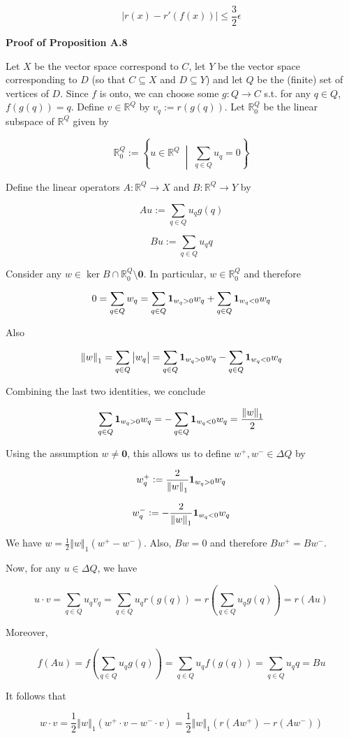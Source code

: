 \documentclass[a4paper]{article}
\newcommand{\Co}[1]{}
\newcommand{\AP}[1]{\left(#1\right)}
\newcommand{\ACM}[2]{\left\{#1\;\middle\vert\;#2\right\}}
\newcommand{\Reals}{\mathbb{R}}
\DeclareMathOperator{\Ker}{ker}
\newcommand{\Abs}[1]{\left\vert #1 \right\vert}
\newcommand{\Norm}[1]{\left\Vert #1 \right\Vert}
\begin{document}
$$\Abs{r\AP{x}-r'\AP{f(x)}} \leq \frac{3}{2}\epsilon$$

\textbf{Proof of Proposition A.8}\Co{b}

Let $X$ be the vector space correspond to $C$, let $Y$ be the vector space corresponding to $D$ (so that $C\subseteq X$ and $D\subseteq Y$) and let $Q$ be the (finite) set of vertices of $D$. Since $f$ is onto, we can choose some $g:Q\rightarrow C$ s.t. for any $q\in Q$, $f\AP{g(q)}=q$. Define $v\in\Reals^Q$ by $v_q:=r\AP{g(q)}$. Let $\Reals^Q_0$ be the linear subspace of $\Reals^Q$ given by 

$$\Reals^Q_0:=\ACM{u\in\Reals^Q}{\sum_{q\in Q}u_q = 0}$$

Define the linear operators $A:\Reals^Q\rightarrow X$ and $B:\Reals^Q\rightarrow Y$ by

$$Au:=\sum_{q\in Q}u_q g(q)$$

$$Bu:=\sum_{q\in Q}u_q q$$

Consider any $w\in\Ker{B}\cap\Reals^Q_0\setminus\boldsymbol{0}$. In particular, $w\in\Reals^Q_0$ and therefore

$$0=\sum_{q\in Q}w_q=\sum_{q\in Q}\bold{1}_{w_q>0}w_q+\sum_{q\in Q}\bold{1}_{w_q<0}w_q$$

Also

$$\Norm{w}_1=\sum_{q\in Q}\Abs{w_q}=\sum_{q\in Q}\bold{1}_{w_q>0}w_q-\sum_{q\in Q}\bold{1}_{w_q<0}w_q$$

Combining the last two identities, we conclude

$$\sum_{q\in Q}\bold{1}_{w_q>0}w_q =-\sum_{q\in Q}\bold{1}_{w_q<0}w_q=\frac{\Norm{w}_1}{2}$$

Using the assumption $w\ne\boldsymbol{0}$, this allows us to define $w^+,w^-\in\Delta Q$ by

$$w^+_q:=\frac{2}{\Norm{w}_1}\bold{1}_{w_q>0}w_q$$

$$w^-_q:=-\frac{2}{\Norm{w}_1}\bold{1}_{w_q<0}w_q$$

We have $w=\frac{1}{2}\Norm{w}_1\AP{w^+-w^-}$. Also, $Bw=0$ and therefore $Bw^+=Bw^-$. 

Now, for any $u\in\Delta Q$, we have

$$u\cdot v=\sum_{q\in Q}u_q v_q=\sum_{q\in Q}u_q r\AP{g(q)}=r\AP{\sum_{q\in Q}u_q g(q)}=r\AP{Au}$$ 

Moreover,

$$f\AP{Au}=f\AP{\sum_{q\in Q}u_q g(q)}=\sum_{q\in Q}u_q f\AP{g(q)}=\sum_{q\in Q}u_q q = Bu$$

It follows that

$$w\cdot v=\frac{1}{2}\Norm{w}_1\AP{w^+\cdot v - w^-\cdot v}=\frac{1}{2}\Norm{w}_1\AP{r\AP{Aw^+}-r\AP{Aw^-}}$$
\end{document}
